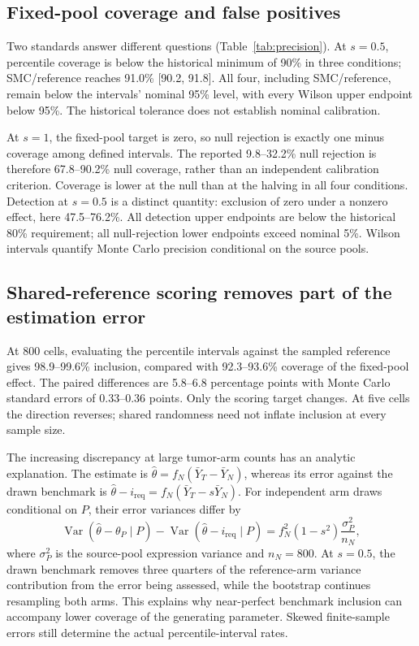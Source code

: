\subsection{Fixed-pool coverage and false positives}
\label{sec:fixedpool}\label{sec:lowcounts}
Two standards answer different questions (Table~\ref{tab:precision}). At
$s=0.5$, percentile coverage is below the historical minimum of 90\% in
three conditions; SMC/reference reaches 91.0\% [90.2, 91.8]. All four,
including SMC/reference, remain below the intervals' nominal 95\% level,
with every Wilson upper endpoint below 95\%. The historical tolerance
does not establish nominal calibration.

At $s=1$, the fixed-pool target is zero, so null rejection is exactly
one minus coverage among defined intervals. The reported 9.8--32.2\%
null rejection is therefore 67.8--90.2\% null coverage, rather than an
independent calibration criterion. Coverage is lower at the null than
at the halving in all four conditions. Detection at $s=0.5$ is a distinct
quantity: exclusion of zero under a nonzero effect, here 47.5--76.2\%.
All detection upper endpoints are below the historical 80\% requirement;
all null-rejection lower endpoints exceed nominal 5\%. Wilson intervals
quantify Monte Carlo precision conditional on the source pools.



\subsection{Shared-reference scoring removes part of the estimation error}
\label{sec:sharedreference}
At 800 cells, evaluating the percentile intervals against the sampled
reference gives 98.9--99.6\% inclusion, compared with 92.3--93.6\%
coverage of the fixed-pool effect. The paired differences are 5.8--6.8
percentage points with Monte Carlo standard errors of 0.33--0.36 points.
Only the scoring target changes. At five cells the direction reverses;
shared randomness need not inflate inclusion at every sample size.

The increasing discrepancy at large tumor-arm counts has an analytic
explanation. The estimate is $\hat\theta=f_N(\bar Y_T-\bar Y_N)$, whereas
its error against the drawn benchmark is
$\hat\theta-i_{\mathrm{req}}=f_N(\bar Y_T-s\bar Y_N)$.
For independent arm draws conditional on $P$, their error variances differ by
\begin{equation}
\operatorname{Var}(\hat\theta-\theta_P\mid P)
-\operatorname{Var}(\hat\theta-i_{\mathrm{req}}\mid P)
=f_N^2(1-s^2)\frac{\sigma_P^2}{n_N},
\label{eq:variancegap}
\end{equation}
where $\sigma_P^2$ is the source-pool expression variance and $n_N=800$.
At $s=0.5$, the drawn benchmark removes three quarters of the reference-arm
variance contribution from the error being assessed, while the bootstrap
continues resampling both arms. This explains why near-perfect benchmark
inclusion can accompany lower coverage of the generating parameter. Skewed
finite-sample errors still determine the actual percentile-interval rates.

